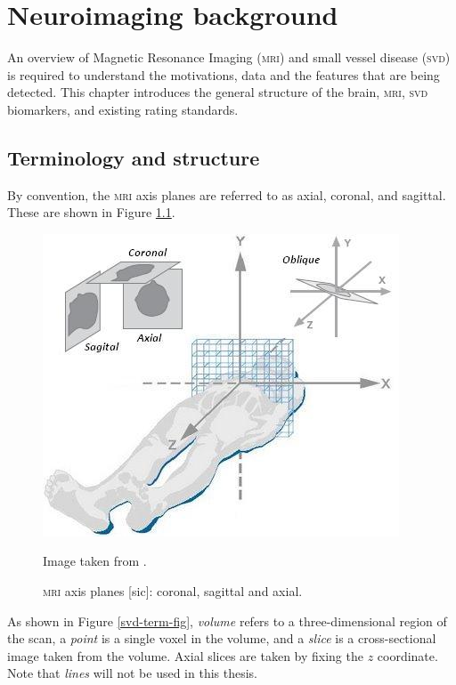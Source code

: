 %
%



\chapter{Neuroimaging background}\label{mri_svd_intro}

An overview of Magnetic Resonance Imaging (\textsc{mri}) and small vessel disease (\textsc{svd}) is required to understand the motivations, data and the features that are being detected. This chapter introduces the general structure of the brain, \textsc{mri}, \textsc{svd} biomarkers, and existing rating standards.

\section{Terminology and structure}

By convention, the \textsc{mri} axis planes are referred to as axial, coronal, and sagittal. These are shown in Figure \ref{svd-axes}.

\begin{figure}[ht]
	\centering
	\includegraphics[scale=0.8]{Images/2_axes2.jpg}
	\caption{\textsc{mri} axis planes [sic]: coronal, sagittal and axial.}
	\small Image taken from \cite{Bean2014}.
	\label{svd-axes}
\end{figure}

As shown in Figure \ref{svd-term-fig}, \textit{volume} refers to a three-dimensional region of the scan, a \textit{point} is a single voxel in the volume, and a \textit{slice} is a cross-sectional image taken from the volume. Axial slices are taken by fixing the $z$ coordinate. Note that \textit{lines} will not be used in this thesis.

